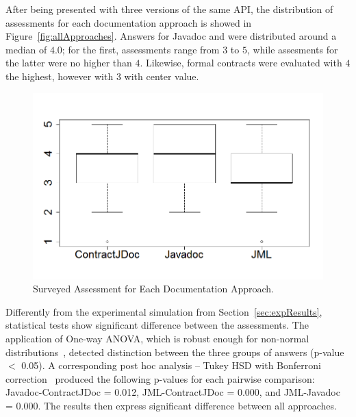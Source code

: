 After being presented with three versions of the same API, the distribution of assessments for each documentation approach is showed in Figure~\ref{fig:allApproaches}.
Answers for Javadoc and \contractjdoc{} were distributed around a median of $4.0$; for the first, assessments range from $3$ to $5$, while assesments for the latter were no higher than $4$.
Likewise, formal contracts were evaluated with $4$ the highest, however with $3$ with center value. 

\begin{figure}
\centering
\includegraphics[width=0.7\linewidth]{figs/boxplotApproachesSurveyStudy}
\caption{Surveyed Assessment for Each Documentation Approach.}
\label{fig:surveyResults}
\end{figure}


Differently from the experimental simulation from Section~\ref{sec:expResults}, statistical tests show significant difference between the assessments. The application of One-way ANOVA, which is robust enough for non-normal distributions~\cite{statistical}, detected distinction between the three groups of answers (p-value $<$ 0.05). A corresponding post hoc analysis -- Tukey HSD 
with Bonferroni correction~\cite{statistical} produced the following p-values for each pairwise comparison: Javadoc-ContractJDoc = 0.012, JML-ContractJDoc = 0.000, and JML-Javadoc = 0.000. The results then express significant difference between all approaches.



